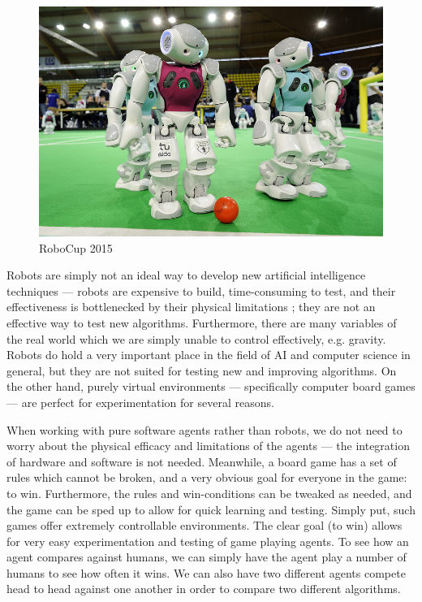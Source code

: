 \begin{figure}[h]
    \centering
    \includegraphics[clip, scale=.25]{images/robocup2015.jpg}
    \caption{RoboCup 2015 \cite{robocup}}
    \label{fig:robocup}
\end{figure}

Robots are simply not an ideal way to develop new artificial intelligence techniques --- robots are expensive to build, time-consuming to test, and their effectiveness is bottlenecked by their physical limitations \cite{Gunderson, Bihlmaier}; they are not an effective way to test new algorithms.  Furthermore, there are many variables of the real world which we are simply unable to control effectively, e.g. gravity.  Robots do hold a very important place in the field of AI and computer science in general, but they are not suited for testing new and improving algorithms.  On the other hand, purely virtual environments --- specifically computer board games --- are perfect for experimentation for several reasons.

When working with pure software agents rather than robots, we do not need to worry about the physical efficacy and limitations of the agents --- the integration of hardware and software is not needed.  Meanwhile, a board game has a set of rules which cannot be broken, and a very obvious goal for everyone in the game: to win.  Furthermore, the rules and win-conditions can be tweaked as needed, and the game can be sped up to allow for quick learning and testing.  Simply put, such games offer extremely controllable environments.  The clear goal (to win) allows for very easy experimentation and testing of game playing agents.  To see how an agent compares against humans, we can simply have the agent play a number of humans to see how often it wins.  We can also have two different agents compete head to head against one another in order to compare two different algorithms.

